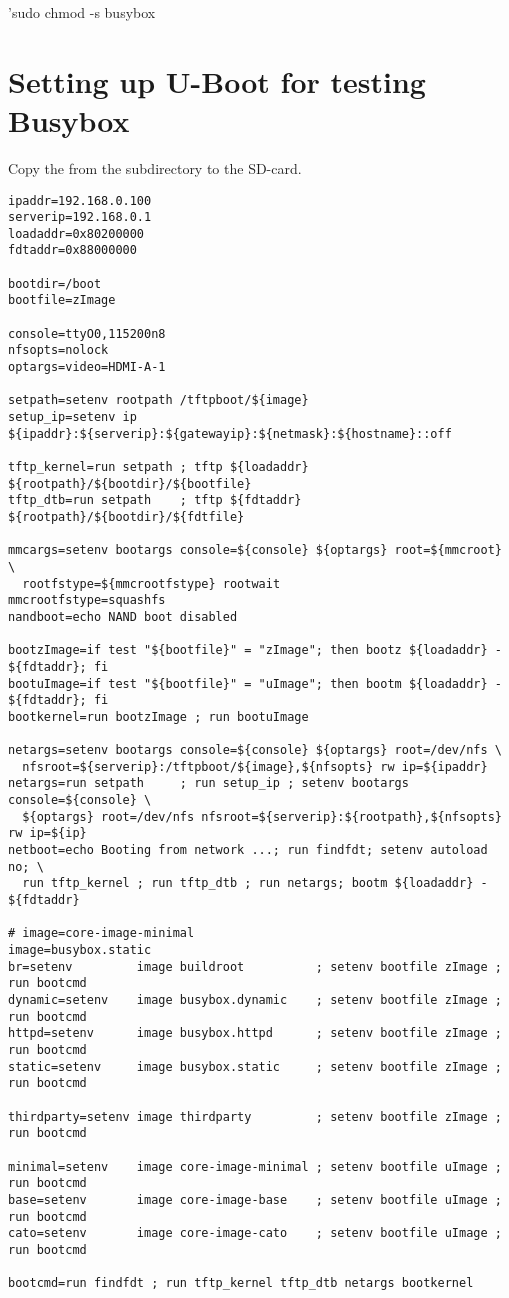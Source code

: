 'sudo chmod -s busybox


\clearpage
\section{Setting up U-Boot for testing Busybox}

Copy the  from the subdirectory to the SD-card.

\begin{verbatim}
ipaddr=192.168.0.100
serverip=192.168.0.1
loadaddr=0x80200000
fdtaddr=0x88000000

bootdir=/boot
bootfile=zImage

console=ttyO0,115200n8
nfsopts=nolock
optargs=video=HDMI-A-1

setpath=setenv rootpath /tftpboot/${image}
setup_ip=setenv ip ${ipaddr}:${serverip}:${gatewayip}:${netmask}:${hostname}::off

tftp_kernel=run setpath ; tftp ${loadaddr} ${rootpath}/${bootdir}/${bootfile}
tftp_dtb=run setpath    ; tftp ${fdtaddr}  ${rootpath}/${bootdir}/${fdtfile}

mmcargs=setenv bootargs console=${console} ${optargs} root=${mmcroot} \
  rootfstype=${mmcrootfstype} rootwait
mmcrootfstype=squashfs
nandboot=echo NAND boot disabled

bootzImage=if test "${bootfile}" = "zImage"; then bootz ${loadaddr} - ${fdtaddr}; fi
bootuImage=if test "${bootfile}" = "uImage"; then bootm ${loadaddr} - ${fdtaddr}; fi
bootkernel=run bootzImage ; run bootuImage

netargs=setenv bootargs console=${console} ${optargs} root=/dev/nfs \
  nfsroot=${serverip}:/tftpboot/${image},${nfsopts} rw ip=${ipaddr}
netargs=run setpath     ; run setup_ip ; setenv bootargs console=${console} \
  ${optargs} root=/dev/nfs nfsroot=${serverip}:${rootpath},${nfsopts} rw ip=${ip}
netboot=echo Booting from network ...; run findfdt; setenv autoload no; \
  run tftp_kernel ; run tftp_dtb ; run netargs; bootm ${loadaddr} - ${fdtaddr}

# image=core-image-minimal
image=busybox.static
br=setenv         image buildroot          ; setenv bootfile zImage ; run bootcmd
dynamic=setenv    image busybox.dynamic    ; setenv bootfile zImage ; run bootcmd
httpd=setenv      image busybox.httpd      ; setenv bootfile zImage ; run bootcmd
static=setenv     image busybox.static     ; setenv bootfile zImage ; run bootcmd

thirdparty=setenv image thirdparty         ; setenv bootfile zImage ; run bootcmd

minimal=setenv    image core-image-minimal ; setenv bootfile uImage ; run bootcmd
base=setenv       image core-image-base    ; setenv bootfile uImage ; run bootcmd
cato=setenv       image core-image-cato    ; setenv bootfile uImage ; run bootcmd

bootcmd=run findfdt ; run tftp_kernel tftp_dtb netargs bootkernel
\end{verbatim}

